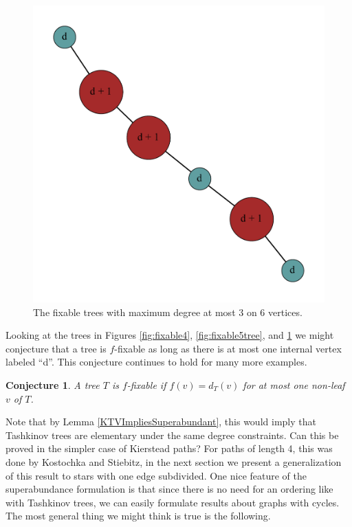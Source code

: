 \documentclass[12pt]{article}
\theoremstyle{plain}
\newtheorem{conjecture}[thm]{Conjecture}
\theoremstyle{definition}
\theoremstyle{remark}
\begin{document}
\begin{figure}[htb]
\includegraphics[scale=0.25]{Superabundance/MaxDegree3Trees/001010011010000[3,2,1,1,3,3].pdf}
\caption{The fixable trees with maximum degree at most 3 on 6 vertices.}
\label{fig:fixable6tree}
\end{figure}

Looking at the trees in Figures \ref{fig:fixable4}, \ref{fig:fixable5tree}, and
\ref{fig:fixable6tree} we might conjecture that a tree is $f$-fixable as long
as there is at most one internal vertex labeled ``d''.  This conjecture
continues to hold for many more examples.

\begin{conjecture}\label{OneHighConjecture}
A tree $T$ is $f$-fixable if $f(v) = d_T(v)$ for at most one non-leaf $v$ of $T$.
\end{conjecture}

Note that by Lemma \ref{KTVImpliesSuperabundant}, this would imply that
Tashkinov trees are elementary under the same degree constraints.  Can this be
proved in the simpler case of Kierstead paths?  For paths of length 4, this was
done by Kostochka and Stiebitz, in the next section we present a generalization
of this result to stars with one edge subdivided.   One nice feature of the
superabundance formulation is that since there is no need for an ordering like
with Tashkinov trees, we can easily formulate results about graphs with cycles.
 The most general thing we might think is true is the following.
\end{document}
